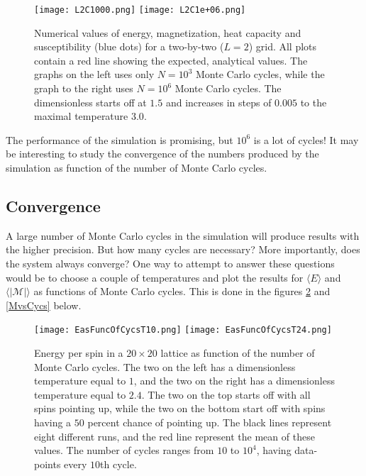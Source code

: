 \documentclass[twoside,utf8]{article}
\newcommand{\expe}[1]{ \langle #1 \rangle }
\begin{document}
\begin{figure}[H]
\begin{center}
\texttt{[image: L2C1000.png]}
\texttt{[image: L2C1e+06.png]}
\end{center}
\caption{
Numerical values of energy, magnetization, heat capacity and susceptibility (blue dots) for a two-by-two ($L=2$) grid. All plots contain a red line showing the expected, analytical values. The graphs on the left uses only $N=10^{3}$ Monte Carlo cycles, while the graph to the right uses $N=10^{6}$ Monte Carlo cycles. The dimensionless starts off at $1.5$ and increases in steps of $0.005$ to the maximal temperature $3.0$.
}
\label{L2vsAnalytic}
\end{figure}



\noindent
The performance of the simulation is promising, but $10^6$ is a lot of cycles! It may be interesting to study the convergence of the numbers produced by the simulation as function of the number of Monte Carlo cycles. 






\subsection{Convergence}
\noindent
A large number of Monte Carlo cycles in the simulation will produce results with the higher precision. But how many cycles are necessary? More importantly, does the system always converge? One way to attempt to answer these questions would be to choose a couple of temperatures and plot the results for $\expe{E}$ and $\expe{|\mathcal{M}|}$ as functions of Monte Carlo cycles. This is done in the figures \ref*{EvsCycs} and \ref*{MvsCycs} below. 


\begin{figure}[H]
\begin{center}
\texttt{[image: EasFuncOfCycsT10.png]}
\texttt{[image: EasFuncOfCycsT24.png]}
\end{center}
\caption{
Energy per spin in a $20\times 20$ lattice as function of the number of Monte Carlo cycles. The two on the left has a dimensionless temperature equal to $1$, and the two on the right has a dimensionless temperature equal to $2.4$. The two on the top starts off with all spins pointing up, while the two on the bottom start off with spins having a $50$ percent chance of pointing up. The black lines represent eight different runs, and the red line represent the mean of these values. The number of cycles ranges from $10$ to $10^4$, having data-points every $10$th cycle.
}
\label{EvsCycs}
\end{figure}
\end{document}

